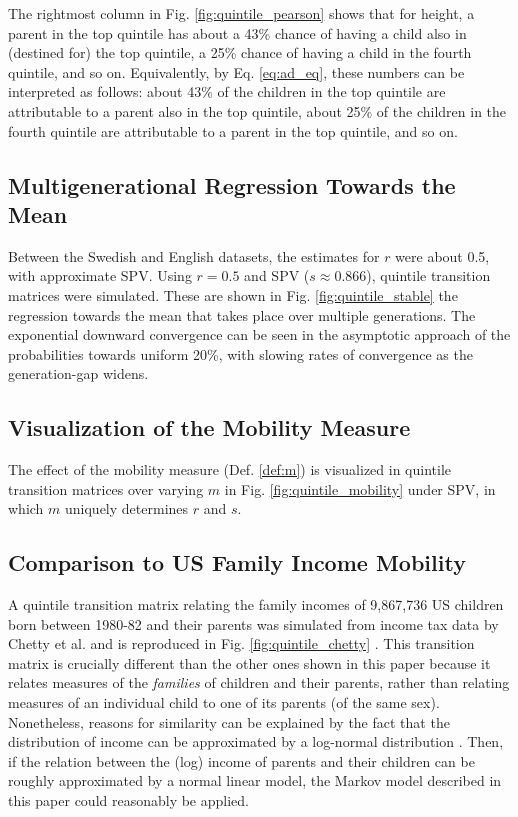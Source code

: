 \documentclass{svproc} %
\begin{document}
The rightmost column in Fig. \ref{fig:quintile_pearson} shows that for height, a parent in the top quintile has about a 43\% chance of having a child also in (destined for) the top quintile, a 25\% chance of having a child in the fourth quintile, and so on. Equivalently, by Eq. \ref{eq:ad_eq}, these numbers can be interpreted as follows: about 43\% of the children in the top quintile are attributable to a parent also in the top quintile, about 25\% of the children in the fourth quintile are attributable to a parent in the top quintile, and so on. 


\subsection{Multigenerational Regression Towards the Mean}

Between the Swedish and English datasets, the estimates for $r$ were about 0.5, with approximate SPV. Using $r = 0.5$ and SPV ($s \approx 0.866$), quintile transition matrices were simulated. These are shown in Fig. \ref{fig:quintile_stable} the regression towards the mean that takes place over multiple generations. The exponential downward convergence can be seen in the asymptotic approach of the probabilities towards uniform 20\%, with slowing rates of convergence as the generation-gap widens. 


\subsection{Visualization of the Mobility Measure}

The effect of the mobility measure (Def. \ref{def:m}) is visualized in quintile transition matrices over varying $m$ in Fig. \ref{fig:quintile_mobility} under SPV, in which $m$ uniquely determines $r$ and $s$.


\subsection{Comparison to US Family Income Mobility}

A quintile transition matrix relating the family incomes of 9,867,736 US children born between 1980-82 and their parents was simulated from income tax data by Chetty et al. and is reproduced in Fig. \ref{fig:quintile_chetty} \cite{chetty}. This transition matrix is crucially different than the other ones shown in this paper because it relates measures of the \emph{families} of children and their parents, rather than relating measures of an individual child to one of its parents (of the same sex). Nonetheless, reasons for similarity can be explained by the fact that the distribution of income can be approximated by a log-normal distribution \cite{battistin, neal}. Then, if the relation between the (log) income of parents and their children can be roughly approximated by a normal linear model, the Markov model described in this paper could reasonably be applied.
\end{document}
